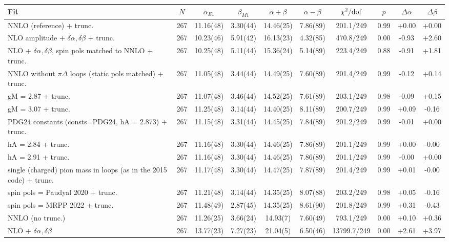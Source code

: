 \begin{tabular}{lccccccccc}
\hline
Fit & $N$ & $\alpha_{E1}$ & $\beta_{M1}$ & $\alpha+\beta$ & $\alpha-\beta$ & $\chi^2/{\rm dof}$ & $p$ & $\Delta\alpha$ & $\Delta\beta$ \\
\hline
NNLO (reference) + trunc. & 267 & 11.16(48) & 3.30(44) & 14.46(25) & 7.86(89) & 201.1/249 & 0.99 & +0.00 & +0.00 \\
NLO amplitude + $\delta\alpha,\delta\beta$ + trunc. & 267 & 10.23(46) & 5.91(42) & 16.13(23) & 4.32(85) & 470.8/249 & 0.00 & -0.93 & +2.60 \\
NLO + $\delta\alpha,\delta\beta$, spin pols matched to NNLO + trunc. & 267 & 10.25(48) & 5.11(44) & 15.36(24) & 5.14(89) & 223.4/249 & 0.88 & -0.91 & +1.81 \\
NNLO without $\pi\Delta$ loops (static pols matched) + trunc. & 267 & 11.05(48) & 3.44(44) & 14.49(25) & 7.60(89) & 201.4/249 & 0.99 & -0.12 & +0.14 \\
gM = 2.87 + trunc. & 267 & 11.07(48) & 3.46(44) & 14.52(25) & 7.61(89) & 203.1/249 & 0.98 & -0.09 & +0.15 \\
gM = 3.07 + trunc. & 267 & 11.25(48) & 3.14(44) & 14.40(25) & 8.11(89) & 200.7/249 & 0.99 & +0.09 & -0.16 \\
PDG24 constants (consts=PDG24, hA = 2.873) + trunc. & 267 & 11.15(48) & 3.31(44) & 14.45(25) & 7.84(89) & 201.2/249 & 0.99 & -0.01 & +0.00 \\
hA = 2.84 + trunc. & 267 & 11.16(48) & 3.30(44) & 14.46(25) & 7.86(89) & 201.1/249 & 0.99 & +0.00 & -0.00 \\
hA = 2.91 + trunc. & 267 & 11.16(48) & 3.30(44) & 14.46(25) & 7.86(89) & 201.1/249 & 0.99 & -0.00 & +0.00 \\
single (charged) pion mass in loops (as in the 2015 code) + trunc. & 267 & 11.17(48) & 3.30(44) & 14.47(25) & 7.87(89) & 201.4/249 & 0.99 & +0.01 & -0.00 \\
spin pols = Paudyal 2020 + trunc. & 267 & 11.21(48) & 3.14(44) & 14.35(25) & 8.07(88) & 203.2/249 & 0.98 & +0.05 & -0.16 \\
spin pols = MRPP 2022 + trunc. & 267 & 11.48(49) & 2.87(45) & 14.35(25) & 8.61(90) & 201.8/249 & 0.99 & +0.31 & -0.43 \\
NNLO (no trunc.) & 267 & 11.26(25) & 3.66(24) & 14.93(7) & 7.60(49) & 793.1/249 & 0.00 & +0.10 & +0.36 \\
NLO + $\delta\alpha,\delta\beta$ & 267 & 13.77(23) & 7.27(23) & 21.04(5) & 6.50(46) & 13799.7/249 & 0.00 & +2.61 & +3.97 \\

\end{tabular}
